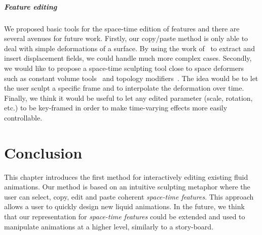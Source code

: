 \subparagraph{Feature editing} 
We proposed basic tools for the space-time edition of features and there are several avenues for future work. 
Firstly, our copy/paste method is only able to deal with simple deformations of a surface. 
By using the work of~\cite{Takahashi2003} to extract and insert displacement fields, we could handle much more complex cases. 
Secondly, we would like to propose a space-time sculpting tool close to space deformers such as constant volume tools~\cite{Angelidis2006b,funk2006vector} and topology modifiers~\cite{stanculescu2011freestyle}. 
The idea would be to let the user sculpt a specific frame and to interpolate the deformation over time. 
Finally, we think it would be useful to let any edited parameter (scale, rotation, etc.) to be key-framed in order to make time-varying effects more easily controllable.

\section{Conclusion} \label{sec:fluidsculpting:conclusion}

This chapter introduces the first method for interactively editing existing fluid animations.
Our method is based on an intuitive sculpting metaphor where the user can select, copy, edit and paste coherent \emph{space-time features}. 
This approach allows a user to quickly design new liquid animations. 
In the future, we think that our representation for \emph{space-time features} could be extended and used to manipulate animations at a higher level, similarly to a story-board. 


